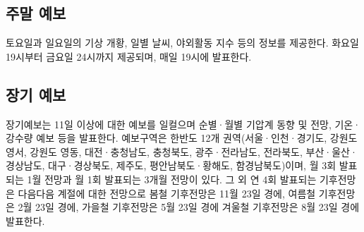 \subsection{주말 예보}
토요일과 일요일의 기상 개황, 일별 날씨, 야외활동 지수 등의 정보를 제공한다. 화요일 19시부터 금요일 24시까지 제공되며, 매일 19시에 발표한다.

\subsection{장기 예보}
장기예보는 11일 이상에 대한 예보를 일컬으며 순별·월별 기압계 동향 및 전망, 기온·강수량 예보 등을 발표한다. 예보구역은 한반도 12개 권역(서울·인천·경기도, 강원도 영서, 강원도 영동, 대전·충청남도, 충청북도, 광주·전라남도, 전라북도, 부산·울산·경상남도, 대구·경상북도, 제주도, 평안남북도·황해도, 함경남북도)이며, 월 3회 발표되는 1월 전망과 월 1회 발표되는 3개월 전망이 있다. 그 외 연 4회 발표되는 기후전망은 다음다음 계절에 대한 전망으로 봄철 기후전망은 11월 23일 경에, 여름철 기후전망은 2월 23일 경에, 가을철 기후전망은 5월 23일 경에 겨울철 기후전망은 8월 23일 경에 발표한다.

